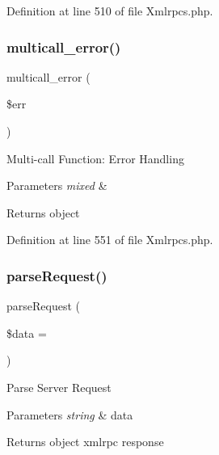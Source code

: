 Definition at line 510 of file Xmlrpcs.\+php.

\mbox{\label{class_c_i___xmlrpcs_a4cf545e6c15e1487b223346b18ca017d}} 
\subsubsection{\texorpdfstring{multicall\_error()}{multicall\_error()}}
{\footnotesize\ttfamily multicall\+\_\+error (\begin{DoxyParamCaption}\item[{}]{\$err }\end{DoxyParamCaption})}

Multi-\/call Function\+: Error Handling


\begin{DoxyParams}{Parameters}
{\em mixed} & \\
\hline
\end{DoxyParams}
\begin{DoxyReturn}{Returns}
object 
\end{DoxyReturn}


Definition at line 551 of file Xmlrpcs.\+php.

\mbox{\label{class_c_i___xmlrpcs_a8a0c34554b9238be766ab85f55519b6e}} 
\subsubsection{\texorpdfstring{parseRequest()}{parseRequest()}}
{\footnotesize\ttfamily parse\+Request (\begin{DoxyParamCaption}\item[{}]{\$data = {\ttfamily \textquotesingle{}\textquotesingle{}} }\end{DoxyParamCaption})}

Parse Server Request


\begin{DoxyParams}{Parameters}
{\em string} & data \\
\hline
\end{DoxyParams}
\begin{DoxyReturn}{Returns}
object xmlrpc response 
\end{DoxyReturn}


